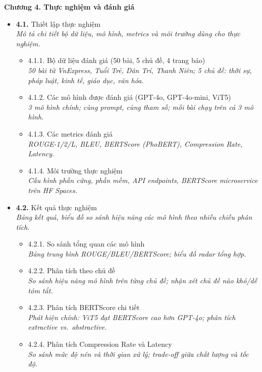 \documentclass[a4paper,12pt]{article}
\begin{document}
{\fontsize{13pt}{15pt}\selectfont\bfseries Chương 4. Thực nghiệm và đánh giá}

\begin{itemize}[leftmargin=1cm, labelsep=0.3cm, itemsep=1pt, label={}]
  \item \textbf{4.1.} Thiết lập thực nghiệm \\
  {\small\itshape Mô tả chi tiết bộ dữ liệu, mô hình, metrics và môi trường dùng cho thực nghiệm.}
  \begin{itemize}[leftmargin=1cm, itemsep=0pt, label={}]
    \item 4.1.1. Bộ dữ liệu đánh giá (50 bài, 5 chủ đề, 4 trang báo) \\
      {\small\itshape 50 bài từ VnExpress, Tuổi Trẻ, Dân Trí, Thanh Niên; 5 chủ đề: thời sự, pháp luật, kinh tế, giáo dục, văn hóa.}
    \item 4.1.2. Các mô hình được đánh giá (GPT-4o, GPT-4o-mini, ViT5) \\
      {\small\itshape 3 mô hình chính; cùng prompt, cùng tham số; mỗi bài chạy trên cả 3 mô hình.}
    \item 4.1.3. Các metrics đánh giá \\
      {\small\itshape ROUGE-1/2/L, BLEU, BERTScore (PhoBERT), Compression Rate, Latency.}
    \item 4.1.4. Môi trường thực nghiệm \\
      {\small\itshape Cấu hình phần cứng, phần mềm, API endpoints, BERTScore microservice trên HF Spaces.}
  \end{itemize}

  \item \textbf{4.2.} Kết quả thực nghiệm \\
  {\small\itshape Bảng kết quả, biểu đồ so sánh hiệu năng các mô hình theo nhiều chiều phân tích.}
  \begin{itemize}[leftmargin=1cm, itemsep=0pt, label={}]
    \item 4.2.1. So sánh tổng quan các mô hình \\
      {\small\itshape Bảng trung bình ROUGE/BLEU/BERTScore; biểu đồ radar tổng hợp.}
    \item 4.2.2. Phân tích theo chủ đề \\
      {\small\itshape So sánh hiệu năng mô hình trên từng chủ đề; nhận xét chủ đề nào khó/dễ tóm tắt.}
    \item 4.2.3. Phân tích BERTScore chi tiết \\
      {\small\itshape Phát hiện chính: ViT5 đạt BERTScore cao hơn GPT-4o; phân tích extractive vs.\ abstractive.}
    \item 4.2.4. Phân tích Compression Rate và Latency \\
      {\small\itshape So sánh mức độ nén và thời gian xử lý; trade-off giữa chất lượng và tốc độ.}
  \end{itemize}


\end{itemize}
\end{document}
